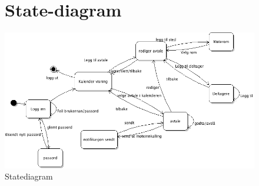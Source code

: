 \begin{figure}
\section{State-diagram}

\includegraphics[width=150mm]{MMIstatediagram.png}
\caption{Statediagram}
\end{figure}